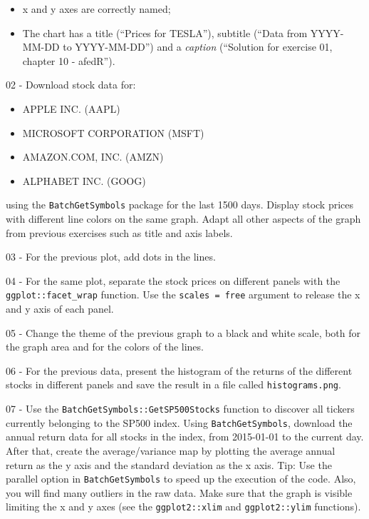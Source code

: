 \documentclass[
  12pt,
]{book}
\providecommand{\tightlist}{%
  \setlength{\itemsep}{0pt}\setlength{\parskip}{0pt}}
\begin{document}
\begin{itemize}
\tightlist
\item
  x and y axes are correctly named;
\item
  The chart has a title (``Prices for TESLA''), subtitle (``Data from YYYY-MM-DD to YYYY-MM-DD'') and a \emph{caption} (``Solution for exercise 01, chapter 10 - afedR'').
\end{itemize}

02 -
Download stock data for:

\begin{itemize}
\tightlist
\item
  APPLE INC. (AAPL)
\item
  MICROSOFT CORPORATION (MSFT)
\item
  AMAZON.COM, INC. (AMZN)
\item
  ALPHABET INC. (GOOG)
\end{itemize}

using the \texttt{BatchGetSymbols} package for the last 1500 days. Display stock prices with different line colors on the same graph. Adapt all other aspects of the graph from previous exercises such as title and axis labels.

03 -
For the previous plot, add dots in the lines.

04 -
For the same plot, separate the stock prices on different panels with the \texttt{ggplot::facet\_wrap} function. Use the \texttt{scales\ =\ \textquotesingle{}free\textquotesingle{}} argument to release the x and y axis of each panel.

05 -
Change the theme of the previous graph to a black and white scale, both for the graph area and for the colors of the lines.

06 -
For the previous data, present the histogram of the returns of the different stocks in different panels and save the result in a file called \texttt{\textquotesingle{}histograms.png\textquotesingle{}}.

07 -
Use the \texttt{BatchGetSymbols::GetSP500Stocks} function to discover all tickers currently belonging to the SP500 index. Using \texttt{BatchGetSymbols}, download the annual return data for all stocks in the index, from 2015-01-01 to the current day. After that, create the average/variance map by plotting the average annual return as the y axis and the standard deviation as the x axis. Tip: Use the parallel option in \texttt{BatchGetSymbols} to speed up the execution of the code. Also, you will find many outliers in the raw data. Make sure that the graph is visible limiting the x and y axes (see the \texttt{ggplot2::xlim} and \texttt{ggplot2::ylim} functions).
\end{document}
